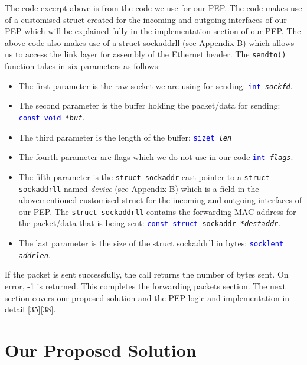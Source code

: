 \documentclass{uathesis}
\begin{document}
The code excerpt above is from the code we use for our PEP. The code makes use of a customised struct created for the incoming and outgoing interfaces of our PEP which will be explained fully in the implementation section of our PEP. The above code also makes use of a struct sockaddr\textunderscore ll (see Appendix B)  which allows us to access the link layer for assembly of the Ethernet header. The {\tt sendto()} function takes in six parameters as follows:\\

\begin{itemize}
\item The first parameter is the raw socket we are using for sending: {\tt \textcolor{blue}{int} \emph{sockfd}}.
\item The second parameter is the buffer holding the packet/data for sending: {\tt  \textcolor{blue}{const void} \emph{*buf}}.
\item The third parameter is the length of the buffer: {\tt  \textcolor{blue}{size\textunderscore t} \emph{len}}
\item The fourth parameter are flags which we do not use in our code {\tt  \textcolor{blue}{int} \emph{flags}}.
\item The fifth parameter is the {\tt struct sockaddr} cast pointer to a {\tt struct sockaddr\textunderscore ll} named \emph{device} (see Appendix B) which is a field in the abovementioned customised struct for the incoming and outgoing interfaces of our PEP. The {\tt struct sockaddr\textunderscore ll} contains the forwarding MAC address for the packet/data that is being sent: {\tt  \textcolor{blue}{const struct} sockaddr \emph{*dest\textunderscore addr}}.
\item The last parameter is the size of the struct sockaddr\textunderscore ll in bytes: {\tt  \textcolor{blue}{socklen\textunderscore t} \emph{addrlen}}.\\
\end{itemize}

If the packet is sent successfully, the call returns the number of bytes sent. On error, -1 is returned. This completes the forwarding packets section. The next section covers our proposed solution and the PEP logic and implementation in detail [35][38].

\section{Our Proposed Solution}
\end{document}
